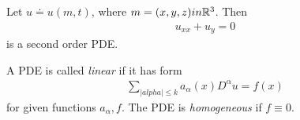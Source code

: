 \begin{example}
	Let $u\doteq u(m,t)$, where $m = (x,y,z) in \mathbb{R}^{3}$. Then
	\begin{equation*}
	\begin{split}
		u_{xx} + u_{y} = 0
	\end{split}
	\end{equation*}
	is a second order PDE.
\end{example}
\begin{definition}
A PDE is called \emph{linear} if it has form
\begin{equation*}
\begin{split}
	\sum_{|alpha| \le k} a_{\alpha}(x) D^{\alpha} u = f(x)
\end{split}
\end{equation*}
for given functions $a_{\alpha}, f$. The PDE is \emph{homogeneous} if $f \equiv
0$.
\end{definition}



